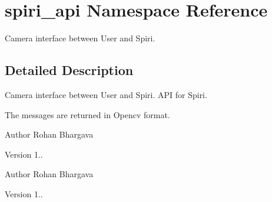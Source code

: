\hypertarget{namespacespiri__api}{\section{spiri\-\_\-api \-Namespace \-Reference}
\label{namespacespiri__api}
}


\-Camera interface between \-User and \-Spiri.  




\subsection{\-Detailed \-Description}
\-Camera interface between \-User and \-Spiri. \-A\-P\-I for \-Spiri.

\-The messages are returned in \-Opencv format. \begin{DoxyAuthor}{\-Author}
\-Rohan \-Bhargava 
\end{DoxyAuthor}
\begin{DoxyVersion}{\-Version}
1..
\end{DoxyVersion}
\begin{DoxyAuthor}{\-Author}
\-Rohan \-Bhargava 
\end{DoxyAuthor}
\begin{DoxyVersion}{\-Version}
1.. 
\end{DoxyVersion}
